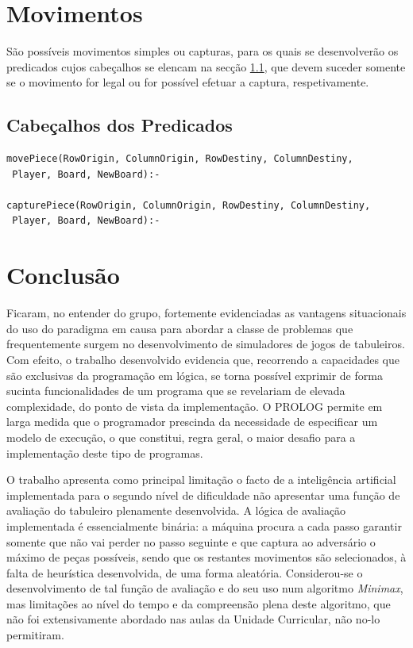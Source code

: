 \documentclass[a4paper]{article}
\begin{document}
\section{Movimentos}
São possíveis movimentos simples ou capturas, para os quais se desenvolverão os predicados cujos cabeçalhos se elencam na secção \ref{sec:predicates}, que devem suceder somente se o movimento for legal ou for possível efetuar a captura, respetivamente.

\subsection{Cabeçalhos dos Predicados} \label{sec:predicates}
\begin{verbatim}
movePiece(RowOrigin, ColumnOrigin, RowDestiny, ColumnDestiny,
 Player, Board, NewBoard):-

capturePiece(RowOrigin, ColumnOrigin, RowDestiny, ColumnDestiny,
 Player, Board, NewBoard):-
\end{verbatim}

\section{Conclusão}
Ficaram, no entender do grupo, fortemente evidenciadas as vantagens situacionais do uso do paradigma em causa para abordar a classe de problemas que frequentemente surgem no desenvolvimento de simuladores de jogos de tabuleiros. Com efeito, o trabalho desenvolvido evidencia que, recorrendo a capacidades que são exclusivas da programação em lógica, se torna possível exprimir de forma sucinta funcionalidades de um programa que se revelariam de elevada complexidade, do ponto de vista da implementação. O PROLOG permite em larga medida que o programador prescinda da necessidade de especificar um modelo de execução, o que constitui, regra geral, o maior desafio para a implementação deste tipo de programas.

O trabalho apresenta como principal limitação o facto de a inteligência artificial implementada para o segundo nível de dificuldade não apresentar uma função de avaliação do tabuleiro plenamente desenvolvida. A lógica de avaliação implementada é essencialmente binária: a máquina procura a cada passo garantir somente que não vai perder no passo seguinte e que captura ao adversário o máximo de peças possíveis, sendo que os restantes movimentos são selecionados, à falta de heurística desenvolvida, de uma forma aleatória. Considerou-se o desenvolvimento de tal função de avaliação e do seu uso num algoritmo \textit{Minimax}, mas limitações ao nível do tempo e da compreensão plena deste algoritmo, que não foi extensivamente abordado nas aulas da Unidade Curricular, não no-lo permitiram.
\end{document}
